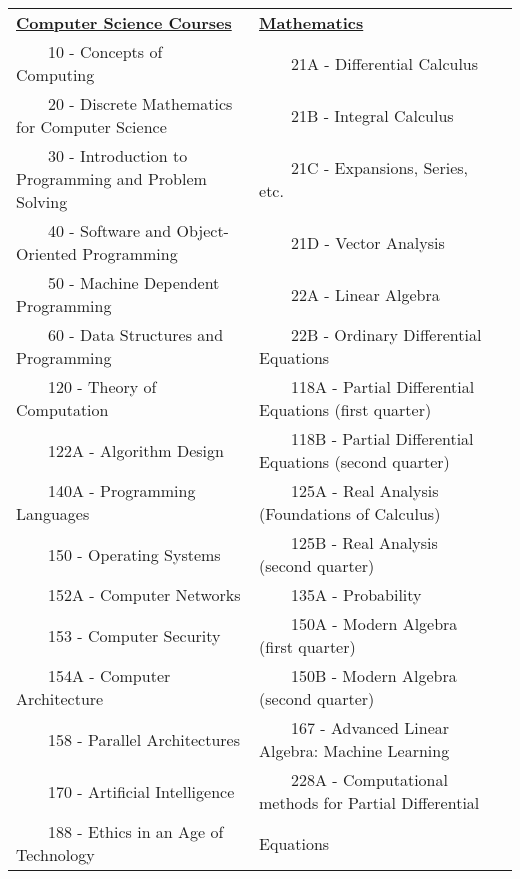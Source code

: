 \documentclass[11pt]{ltxdoc}
\newcommand{\tabitem}{~~\llap{\textbullet}~~}
\begin{document}
\begin{tabular}{lll}
  \textbf{\underline{Computer Science Courses}} & \textbf{\underline{Mathematics}} \\
  \tabitem 10 - Concepts of Computing & \tabitem 21A - Differential Calculus \\
  \tabitem 20 - Discrete Mathematics for Computer Science & 	\tabitem 21B - Integral Calculus \\
  \tabitem 30 - Introduction to Programming and Problem Solving & 	\tabitem 21C - Expansions, Series, etc. \\
  \tabitem 40 - Software and Object-Oriented Programming & 	\tabitem 21D - Vector Analysis \\
  \tabitem 50 - Machine Dependent Programming & 	\tabitem 22A - Linear Algebra \\
  \tabitem 60 - Data Structures and Programming & 	\tabitem 22B - Ordinary Differential Equations \\
  \tabitem 120 - Theory of Computation & 	\tabitem 118A - Partial Differential Equations   (first quarter) \\
  \tabitem 122A - Algorithm Design & 	\tabitem 118B - Partial Differential Equations   (second quarter) \\
  \tabitem 140A - Programming Languages & 	\tabitem 125A - Real Analysis (Foundations of Calculus) \\
  \tabitem 150 - Operating Systems & 	\tabitem 125B - Real Analysis (second quarter) \\
  \tabitem 152A - Computer Networks & 	\tabitem 135A - Probability \\
  \tabitem 153 - Computer Security & 	\tabitem 150A - Modern Algebra (first quarter) \\
  \tabitem 154A - Computer Architecture & 	\tabitem 150B - Modern Algebra (second quarter) \\
  \tabitem 158 - Parallel Architectures & 	\tabitem 167  - Advanced Linear Algebra: Machine Learning \\
  \tabitem 170 - Artificial Intelligence & 	\tabitem 228A - Computational methods for Partial Differential \\
  \tabitem 188 - Ethics in an Age of Technology & \qquad\qquad Equations
\end{tabular}
\end{document}
